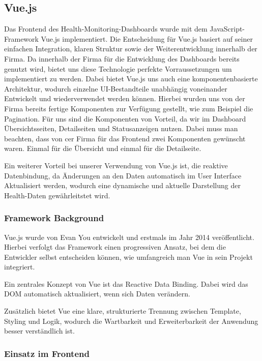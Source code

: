 \subsection{Vue.js}
Das Frontend des Health-Monitoring-Dashboards wurde mit dem JavaScript-Framework Vue.js implementiert.
Die Entscheidung für Vue.js basiert auf seiner einfachen Integration, klaren Struktur sowie der Weiterentwicklung innerhalb der Firma.
Da innerhalb der Firma für die Entwicklung des Dashboards bereits genutzt wird, bietet uns diese Technologie perfekte Vorraussetzungen um implementiert zu werden.
Dabei bietet Vue.js uns auch eine komponentenbasierte Architektur, wodurch einzelne UI-Bestandteile unabhängig voneinander Entwickelt und wiederverwendet werden können.
Hierbei wurden uns von der Firma bereits fertige Komponenten zur Verfügung gestellt, wie zum Beispiel die Pagination.
Für uns sind die Komponenten von Vorteil, da wir im Dashboard Übersichtsseiten, Detailseiten und Statusanzeigen nutzen.
Dabei muss man beachten, dass von cer Firma für das Frontend zwei Komponenten gewünscht waren.
Einmal für die Übersicht und einmal für die Detailseite.

Ein weiterer Vorteil bei unserer Verwendung von Vue.js ist, die reaktive Datenbindung, da Änderungen an den Daten automatisch im User Interface Aktualisiert werden, wodurch eine dynamische und aktuelle Darstellung der Health-Daten gewährleitstet wird.

\cite{vuejs}


\subsubsection{Framework Background}

Vue.js wurde von Evan You entwickelt und erstmals im Jahr 2014 veröffentlicht.
Hierbei verfolgt das Framework einen progressiven Ansatz, bei dem die Entwickler selbst entscheiden können, wie umfangreich man Vue in sein Projekt integriert.

Ein zentrales Konzept von Vue ist das Reactive Data Binding.
Dabei wird das DOM automatisch aktualisiert, wenn sich Daten verändern.

Zusätzlich bietet Vue eine klare, strukturierte Trennung zwischen Template, Styling und Logik, wodurch die Wartbarkeit und Erweiterbarkeit der Anwendung besser verständlich ist.

\subsubsection{Einsatz im Frontend}

